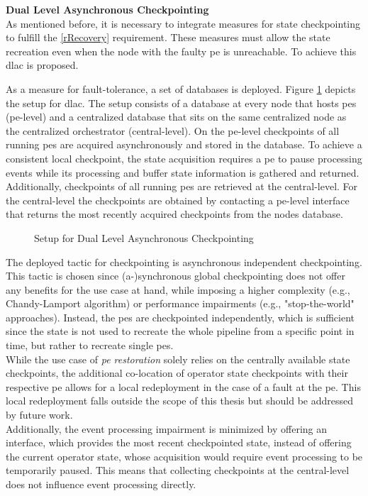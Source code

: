 \textbf{Dual Level Asynchronous Checkpointing}\\
As mentioned before, it is necessary to integrate measures for state checkpointing to fulfill the \ref{rRecovery} requirement. These measures must allow the state recreation even when the node with the faulty \gls{pe} is unreachable. To achieve this \gls{dlac} is proposed.\par
As a measure for fault-tolerance, a set of databases is deployed. Figure \ref{fDLAC} depicts the setup for \gls{dlac}. The setup consists of a database at every node that hosts \gls{pe}s (\gls{pe}-level) and a centralized database that sits on the same centralized node as the centralized orchestrator (central-level). On the \gls{pe}-level checkpoints of all running \gls{pe}s are acquired asynchronously and stored in the database. To achieve a consistent local checkpoint, the state acquisition requires a \gls{pe} to pause processing events while its processing and buffer state information is gathered and returned. Additionally, checkpoints of all running \gls{pe}s are retrieved at the central-level. For the central-level the checkpoints are obtained by contacting a \gls{pe}-level interface that returns the most recently acquired checkpoints from the nodes database.\par
\begin{figure}[H]
\graphicspath{{./figures/code/}}

\caption{Setup for Dual Level Asynchronous Checkpointing}
\label{fDLAC}
\end{figure}
The deployed tactic for checkpointing is asynchronous independent checkpointing. This tactic is chosen since (a-)synchronous global checkpointing does not offer any benefits for the use case at hand, while imposing a higher complexity (e.g., Chandy-Lamport algorithm) or performance impairments (e.g., "stop-the-world" approaches). Instead, the \gls{pe}s are checkpointed independently, which is sufficient since the state is not used to recreate the whole pipeline from a specific point in time, but rather to recreate single \gls{pe}s.\\
While the use case of \textit{\acrshort{pe} restoration} solely relies on the centrally available state checkpoints, the additional co-location of operator state checkpoints with their respective \gls{pe} allows for a local redeployment in the case of a fault at the \gls{pe}. This local redeployment falls outside the scope of this thesis but should be addressed by future work.\\
Additionally, the event processing impairment is minimized by offering an interface, which provides the most recent checkpointed state, instead of offering the current operator state, whose acquisition would require event processing to be temporarily paused. This means that collecting checkpoints at the central-level does not influence event processing directly.\par


